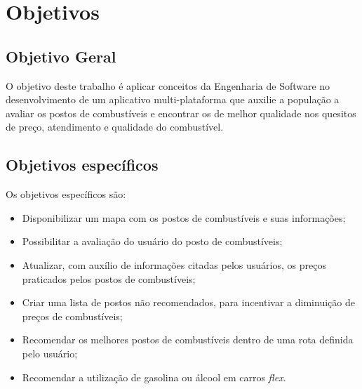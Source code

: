 \section{Objetivos}

\subsection{Objetivo Geral}

O objetivo deste trabalho é aplicar conceitos da Engenharia de Software no desenvolvimento de um aplicativo multi-plataforma que auxilie a população a avaliar os postos de combustíveis e encontrar os de melhor qualidade nos quesitos de preço, atendimento e qualidade do combustível.

\subsection{Objetivos específicos}

Os objetivos específicos são:
\begin{itemize}
    \item Disponibilizar um mapa com os postos de combustíveis e suas informações;
    \item Possibilitar a avaliação do usuário do posto de combustíveis;
    \item Atualizar, com auxílio de informações citadas pelos usuários, os preços praticados pelos postos de combustíveis;
    \item Criar uma lista de postos não recomendados, para incentivar a diminuição de preços de combustíveis;
    \item Recomendar os melhores postos de combustíveis dentro de uma rota definida pelo usuário;
    \item Recomendar a utilização de gasolina ou álcool em carros \textit{flex}.
\end{itemize}
